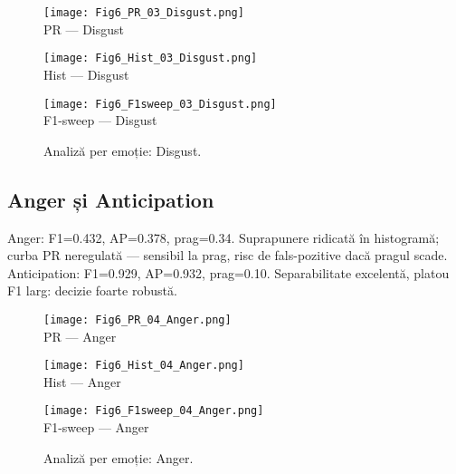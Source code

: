 \begin{figure}[H]
  \centering
  \begin{minipage}[t]{0.32\textwidth}\centering
    \texttt{[image: Fig6\_PR\_03\_Disgust.png]}\\[-1mm]
    {\scriptsize PR — Disgust}
  \end{minipage}\hfill
  \begin{minipage}[t]{0.32\textwidth}\centering
    \texttt{[image: Fig6\_Hist\_03\_Disgust.png]}\\[-1mm]
    {\scriptsize Hist — Disgust}
  \end{minipage}\hfill
  \begin{minipage}[t]{0.32\textwidth}\centering
    \texttt{[image: Fig6\_F1sweep\_03\_Disgust.png]}\\[-1mm]
    {\scriptsize F1-sweep — Disgust}
  \end{minipage}
  \caption{Analiză per emoție: Disgust.}
  \label{fig:c6-disgust}
\end{figure}

\subsection{Anger și Anticipation}
\noindent Anger: F1=0.432, AP=0.378, prag=0.34. Suprapunere ridicată în histogramă; curba PR neregulată — sensibil la prag, risc de fals-pozitive dacă pragul scade.
\noindent Anticipation: F1=0.929, AP=0.932, prag=0.10. Separabilitate excelentă, platou F1 larg: decizie foarte robustă.

\begin{figure}[H]
  \centering
  \begin{minipage}[t]{0.32\textwidth}\centering
    \texttt{[image: Fig6\_PR\_04\_Anger.png]}\\[-1mm]
    {\scriptsize PR — Anger}
  \end{minipage}\hfill
  \begin{minipage}[t]{0.32\textwidth}\centering
    \texttt{[image: Fig6\_Hist\_04\_Anger.png]}\\[-1mm]
    {\scriptsize Hist — Anger}
  \end{minipage}\hfill
  \begin{minipage}[t]{0.32\textwidth}\centering
    \texttt{[image: Fig6\_F1sweep\_04\_Anger.png]}\\[-1mm]
    {\scriptsize F1-sweep — Anger}
  \end{minipage}
  \caption{Analiză per emoție: Anger.}
  \label{fig:c6-anger}
\end{figure}

